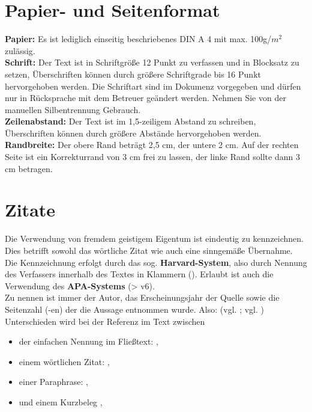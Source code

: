 \documentclass[%
	BCOR=8.25mm,         %
	DIV=12,              %
	parskip=half,		 %
	toc=bibliography,	 %
	headsepline=on,      %
	oneside,
	toc=listof,
	toc=index,
	enabledeprecatedfontcommands,
	]{scrbook}
\begin{document}
\section{Papier- und Seitenformat}
\textbf{Papier:} Es ist lediglich einseitig beschriebenes DIN A 4 mit max. 100g/$m^2$ zul\"assig.\\
\textbf{Schrift:} Der Text ist in Schriftgr\"o{\ss}e 12 Punkt zu verfassen und in Blocksatz zu setzen, \"Uberschriften können durch gr\"o{\ss}ere Schriftgrade bis 16 Punkt hervorgehoben werden. Die Schriftart sind im Dokumenz vorgegeben und dürfen nur in Rücksprache mit dem Betreuer geändert werden. Nehmen Sie von der manuellen Silbentrennung Gebrauch. \\
\textbf{Zeilenabstand:} Der Text ist im 1,5-zeiligem Abstand zu schreiben, \"Uberschriften k\"onnen durch gr\"o{\ss}ere Abst\"ande hervorgehoben werden.\\
\textbf{Randbreite:} Der obere Rand beträgt 2,5 cm, der untere 2 cm. Auf der rechten Seite ist ein Korrekturrand von 3 cm frei zu lassen, der linke Rand sollte dann 3 cm betragen.


\section{Zitate}
Die Verwendung von fremdem geistigem Eigentum ist eindeutig zu kennzeichnen. Dies betrifft sowohl das w\"ortliche Zitat wie auch eine sinngem\"a{\ss}e \"Ubernahme. \\
Die Kennzeichnung erfolgt durch das sog. \textbf{Harvard-System}, also durch Nennung des Verfassers innerhalb des Textes in Klammern (). Erlaubt ist auch die Verwendung des \textbf{APA-Systems} (> v6).\\
Zu nennen ist immer der Autor, das Erscheinungsjahr der Quelle sowie die Seitenzahl (-en) der die Aussage entnommen wurde. Also: (vgl. \citealt[S. 227-228]{corea2017detecting}; vgl. \citealt[S.120]{Delfmann2015DMQL}) \\
Unterschieden wird bei der Referenz im Text zwischen 

\begin{itemize}
	\item{ der einfachen Nennung im Flie{\ss}text: \cite[S. 120]{Delfmann2015DMQL}},
	\item einem wörtlichen Zitat: \citep[vgl.][S. 120]{Delfmann2015DMQL},
	\item einer Paraphrase: \citep[vgl.][S. 120]{Delfmann2015DMQL},
	\item und einem Kurzbeleg \citep[S. 120]{Delfmann2015DMQL},
\end{itemize}
\end{document}
